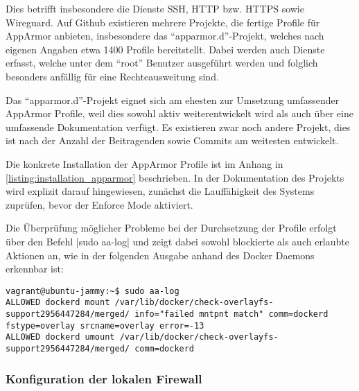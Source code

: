 Dies betrifft insbesondere die Dienste \ac{SSH}, \ac{HTTP} bzw. \ac{HTTPS} sowie Wireguard. Auf Github existieren mehrere Projekte, die fertige Profile für AppArmor anbieten, insbesondere das \enquote{apparmor.d}-Projekt, welches nach eigenen Angaben etwa 1400 Profile bereitstellt. Dabei werden auch Dienste erfasst, welche unter dem \enquote{root} Benutzer ausgeführt werden und folglich besonders anfällig für eine Rechteausweitung sind.

Das \enquote{apparmor.d}-Projekt eignet sich am ehesten zur Umsetzung umfassender AppArmor Profile, weil dies sowohl aktiv weiterentwickelt wird als auch über eine umfassende Dokumentation verfügt. Es existieren zwar noch andere Projekt, dies ist nach der Anzahl der Beitragenden sowie Commits am weitesten entwickelt.

Die konkrete Installation der AppArmor Profile ist im Anhang in \autoref{listing:installation_apparmor} beschrieben. In der Dokumentation des Projekts wird explizit darauf hingewiesen, zunächst die Lauffähigkeit des Systems zuprüfen, bevor der Enforce Mode aktiviert.

Die Überprüfung möglicher Probleme bei der Durchsetzung der Profile erfolgt über den Befehl |sudo aa-log|
und zeigt dabei sowohl blockierte als auch erlaubte Aktionen an, wie in der folgenden Ausgabe anhand des Docker Daemons erkennbar ist:

\begin{verbatim}
vagrant@ubuntu-jammy:~$ sudo aa-log 
ALLOWED dockerd mount /var/lib/docker/check-overlayfs-support2956447284/merged/ info="failed mntpnt match" comm=dockerd fstype=overlay srcname=overlay error=-13
ALLOWED dockerd umount /var/lib/docker/check-overlayfs-support2956447284/merged/ comm=dockerd
\end{verbatim}

\subsubsection{Konfiguration der lokalen Firewall}


